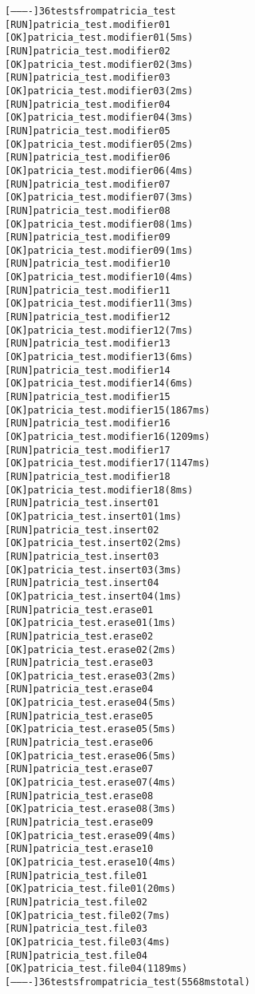 \begin{alltt}
    [----------] 36 tests from patricia_test
    [ RUN      ] patricia_test.modifier01
    [       OK ] patricia_test.modifier01 (5 ms)
    [ RUN      ] patricia_test.modifier02
    [       OK ] patricia_test.modifier02 (3 ms)
    [ RUN      ] patricia_test.modifier03
    [       OK ] patricia_test.modifier03 (2 ms)
    [ RUN      ] patricia_test.modifier04
    [       OK ] patricia_test.modifier04 (3 ms)
    [ RUN      ] patricia_test.modifier05
    [       OK ] patricia_test.modifier05 (2 ms)
    [ RUN      ] patricia_test.modifier06
    [       OK ] patricia_test.modifier06 (4 ms)
    [ RUN      ] patricia_test.modifier07
    [       OK ] patricia_test.modifier07 (3 ms)
    [ RUN      ] patricia_test.modifier08
    [       OK ] patricia_test.modifier08 (1 ms)
    [ RUN      ] patricia_test.modifier09
    [       OK ] patricia_test.modifier09 (1 ms)
    [ RUN      ] patricia_test.modifier10
    [       OK ] patricia_test.modifier10 (4 ms)
    [ RUN      ] patricia_test.modifier11
    [       OK ] patricia_test.modifier11 (3 ms)
    [ RUN      ] patricia_test.modifier12
    [       OK ] patricia_test.modifier12 (7 ms)
    [ RUN      ] patricia_test.modifier13
    [       OK ] patricia_test.modifier13 (6 ms)
    [ RUN      ] patricia_test.modifier14
    [       OK ] patricia_test.modifier14 (6 ms)
    [ RUN      ] patricia_test.modifier15
    [       OK ] patricia_test.modifier15 (1867 ms)
    [ RUN      ] patricia_test.modifier16
    [       OK ] patricia_test.modifier16 (1209 ms)
    [ RUN      ] patricia_test.modifier17
    [       OK ] patricia_test.modifier17 (1147 ms)
    [ RUN      ] patricia_test.modifier18
    [       OK ] patricia_test.modifier18 (8 ms)
    [ RUN      ] patricia_test.insert01
    [       OK ] patricia_test.insert01 (1 ms)
    [ RUN      ] patricia_test.insert02
    [       OK ] patricia_test.insert02 (2 ms)
    [ RUN      ] patricia_test.insert03
    [       OK ] patricia_test.insert03 (3 ms)
    [ RUN      ] patricia_test.insert04
    [       OK ] patricia_test.insert04 (1 ms)
    [ RUN      ] patricia_test.erase01
    [       OK ] patricia_test.erase01 (1 ms)
    [ RUN      ] patricia_test.erase02
    [       OK ] patricia_test.erase02 (2 ms)
    [ RUN      ] patricia_test.erase03
    [       OK ] patricia_test.erase03 (2 ms)
    [ RUN      ] patricia_test.erase04
    [       OK ] patricia_test.erase04 (5 ms)
    [ RUN      ] patricia_test.erase05
    [       OK ] patricia_test.erase05 (5 ms)
    [ RUN      ] patricia_test.erase06
    [       OK ] patricia_test.erase06 (5 ms)
    [ RUN      ] patricia_test.erase07
    [       OK ] patricia_test.erase07 (4 ms)
    [ RUN      ] patricia_test.erase08
    [       OK ] patricia_test.erase08 (3 ms)
    [ RUN      ] patricia_test.erase09
    [       OK ] patricia_test.erase09 (4 ms)
    [ RUN      ] patricia_test.erase10
    [       OK ] patricia_test.erase10 (4 ms)
    [ RUN      ] patricia_test.file01
    [       OK ] patricia_test.file01 (20 ms)
    [ RUN      ] patricia_test.file02
    [       OK ] patricia_test.file02 (7 ms)
    [ RUN      ] patricia_test.file03
    [       OK ] patricia_test.file03 (4 ms)
    [ RUN      ] patricia_test.file04
    [       OK ] patricia_test.file04 (1189 ms)
    [----------] 36 tests from patricia_test (5568 ms total)
    

\end{alltt}
